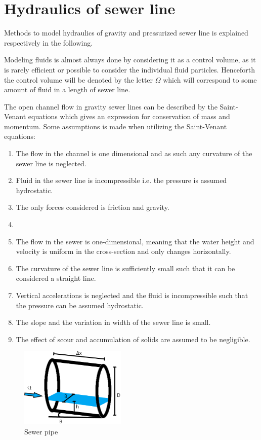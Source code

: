\section{Hydraulics of sewer line}\label{se:hydraulics_of_sewer_line}

Methods to model hydraulics of gravity and pressurized sewer line is explained respectively in the following. 

Modeling fluids is almost always done by considering it as a control volume, as it is rarely efficient or possible to consider the individual fluid particles.
Henceforth the control volume will be denoted by the letter $\Omega$ which will correspond to some amount of fluid in a length of sewer line.

The open channel flow in gravity sewer lines can be described by the Saint-Venant equations which gives an expression for conservation of mass and momentum.
Some assumptions is made when utilizing the Saint-Venant equations:
\begin{table}[H]
\begin{enumerate}
\item The flow in the channel is one dimensional and as such any curvature of the sewer line is neglected.
\item Fluid in the sewer line is incompressible i.e. the pressure is assumed hydrostatic.
\item The only forces considered is friction and gravity.
\item 




\item The flow in the sewer is one-dimensional, meaning that the water height and velocity is uniform in the cross-section and only changes horizontally.
\item The curvature of the sewer line is sufficiently small such that it can be considered a straight line. 
\item Vertical accelerations is neglected and the fluid is incompressible such that the pressure can be assumed hydrostatic.
\item The slope and the variation in width of the sewer line is small.
\item The effect of scour and accumulation of solids are assumed to be negligible. 
\end{enumerate}
\label{tab:saintbernard_assumptions}
\end{table}


\begin{figure}[H]
\centering
\includegraphics[width=0.45\textwidth]{report/modeling/pictures/kloakroer.png}
\caption{Sewer pipe }
\label{fig:kloakroer}
\end{figure}



